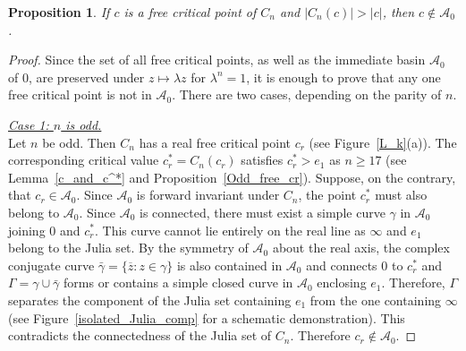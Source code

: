 \documentclass[12pt]{article}
\newtheorem{prop}{Proposition}[section]
\begin{document}
\begin{prop}\label{n-geq-17}
	If  $c$ is a free critical point of $C_n$ and $|C_n(c)|>|c|$, then $c \notin \mathcal{A}_0$. 
\end{prop}
\begin{proof}
	Since the set of all free critical points, as well as the immediate basin $\mathcal{A}_0$ of $0$, are preserved under  $z \mapsto \lambda z$ for $\lambda^n =1$, it is enough to prove that any one free critical point is not in $ \mathcal{A}_0$.
	There are two cases, depending on the parity of $n$.  
	\par
	\noindent \underline{\textit{Case 1: $n$ is odd.}}	\\
	Let $n$ be odd. Then $C_n$ has a real free critical point  $c_r$ (see Figure~\ref{L_k}(a)). The corresponding critical value $c_r^* =C_n (c_r)$ satisfies $c_r^* >e_1$ as $n \geq 17$ (see Lemma~\ref{c_and_c^*} and Proposition~\ref{Odd_free_cr}). Suppose, on the contrary, that $c_r \in \mathcal{A}_0$. Since $\mathcal{A}_0$ is forward invariant under $C_n$, the point $c_r^*$ must also belong to $\mathcal{A}_0$. Since $\mathcal{A}_0$ is connected, there must exist a simple curve $\gamma$ in $\mathcal{A}_0$ joining $0$ and $c_r^*$. This curve cannot lie entirely on the real line as $\infty$ and $e_1$ belong to the Julia set. By the symmetry of $\mathcal{A}_0$ about the real axis, the complex conjugate curve $\bar{\gamma}=\{\overline{z}: z \in \gamma\}$ is also contained in $\mathcal{A}_0$ and connects $0$ to $c_r^*$ and $\Gamma =\gamma \cup \bar{\gamma}$ forms or contains a simple closed curve in $\mathcal{A}_0$ enclosing $e_1$. Therefore, $\Gamma$ separates the component of the Julia set containing $e_1$ from the one containing $\infty$  (see Figure~\ref{isolated_Julia_comp} for a schematic demonstration). This contradicts the connectedness of the Julia set of $C_n$. Therefore $c_r \notin \mathcal{A}_0$.
	

\end{proof}
\end{document}
